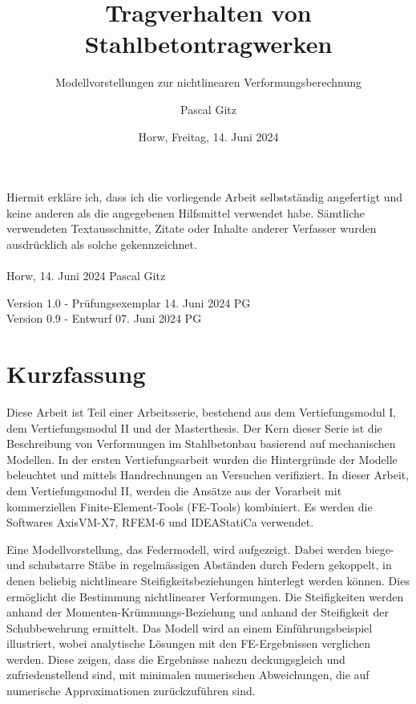 \documentclass[
  11pt,
  letterpaper,
]{scrreprt}
\title{Tragverhalten von Stahlbetontragwerken}
\subtitle
{Modellvorstellungen zur nichtlinearen Verformungsberechnung}
\date{\large Horw, Freitag, 14. Juni 2024}
\author{Pascal Gitz}
\begin{document}
\maketitle


Hiermit erkläre ich, dass ich die vorliegende Arbeit selbstständig angefertigt und keine anderen als die angegebenen Hilfsmittel verwendet habe. Sämtliche verwendeten Textausschnitte, Zitate oder Inhalte anderer Verfasser wurden ausdrücklich als solche gekennzeichnet.\\%
%
\\%
%
Horw, 14. Juni 2024 \hfill Pascal Gitz%

\vfill

Version 1.0 - Prüfungsexemplar \hfill 14. Juni 2024 \quad \quad \quad \quad \quad PG\\
Version 0.9 - Entwurf \hfill 07. Juni 2024 \quad \quad \quad \quad \quad PG\\

\newpage

\chapter*{Kurzfassung}

Diese Arbeit ist Teil einer Arbeitsserie, bestehend aus dem Vertiefungsmodul I, dem Vertiefungsmodul II und der Masterthesis. Der Kern dieser Serie ist die Beschreibung von Verformungen im Stahlbetonbau basierend auf mechanischen Modellen. In der ersten Vertiefungsarbeit wurden die Hintergründe der Modelle beleuchtet und mittels Handrechnungen an Versuchen verifiziert. In dieser Arbeit, dem Vertiefungsmodul II, werden die Ansätze aus der Vorarbeit mit kommerziellen Finite-Element-Tools (FE-Tools) kombiniert. Es werden die Softwares AxisVM-X7, RFEM-6 und IDEAStatiCa verwendet.

Eine Modellvorstellung, das Federmodell, wird aufgezeigt. Dabei werden biege- und schubstarre Stäbe in regelmässigen Abständen durch Federn gekoppelt, in denen beliebig nichtlineare Steifigkeitsbeziehungen hinterlegt werden können. Dies ermöglicht die Bestimmung nichtlinearer Verformungen. Die Steifigkeiten werden anhand der Momenten-Krümmungs-Beziehung und anhand der Steifigkeit der Schubbewehrung ermittelt. Das Modell wird an einem Einführungsbeispiel illustriert, wobei analytische Lösungen mit den FE-Ergebnissen verglichen werden. Diese zeigen, dass die Ergebnisse nahezu deckungsgleich und zufriedenstellend sind, mit minimalen numerischen Abweichungen, die auf numerische Approximationen zurückzuführen sind.
\end{document}
